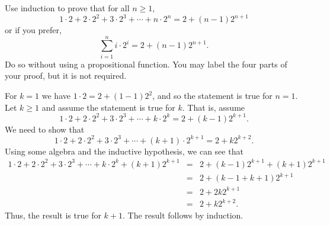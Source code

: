 \begin{exer}\label{exer:sumi2i}
Use induction to prove  that for all $n\geq 1$, 
$$1\cdot 2 + 2\cdot 2^2 + 3\cdot 2^3 + \cdots + n\cdot 2^n = 2 + (n - 1)2^{n + 1}$$
or if you prefer, 
$$\sum_{i=1}^n i\cdot2^i =  2 + (n - 1)2^{n + 1}.$$
Do so without using a propositional function.
You may label the four parts of your proof, but it is not required.

\vspace*{6.5in}
\begin{answer}
For $k = 1$ we have $1\cdot 2 = 2 + (1-1)2^2$, and so the
statement is true for $n = 1$. 
Let $k\geq 1$ and assume the statement is true for
$k$. That is, assume
$$1\cdot 2 + 2\cdot 2^2 + 3\cdot 2^3 + \cdots + k\cdot 2^k = 2 + (k - 1)2^{k + 1}.$$
We need to show that
$$1\cdot 2 + 2\cdot 2^2 + 3\cdot 2^3 + \cdots + (k+1)\cdot 2^{k+1} = 2 + k2^{k + 2}.$$
Using some algebra and the inductive hypothesis, we can see that 
\begin{eqnarray*}
1\cdot 2 + 2\cdot 2^2 + 3\cdot 2^3 + \cdots + k\cdot 2^k + (k+1)2^{k+1} 
&=& 2 + (k - 1)2^{k + 1} + (k+1)2^{k+1}\\
&=& 2 + (k - 1+k+1)2^{k + 1}\\
& =& 2 + 2k2^{k+1}\\ 
&=& 2 + k2^{k+2}.
\end{eqnarray*}
Thus, the result is true for $k+1$.  The result follows by induction.
\end{answer}
\end{exer}


